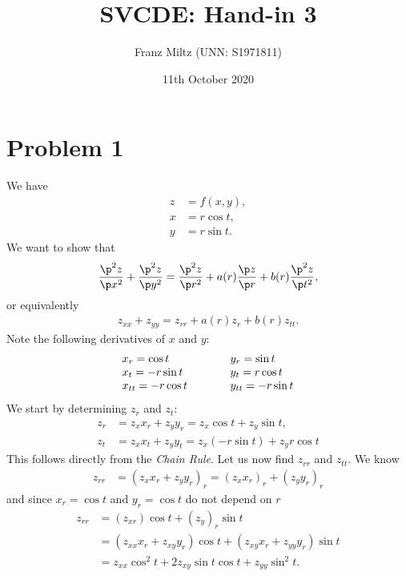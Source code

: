 \documentclass{article}
\begin{document}
\title{SVCDE: Hand-in 3}
\author{Franz Miltz (UNN: S1971811)}
\date{11th October 2020}
\maketitle


\section*{Problem 1}


We have
\begin{align*}
  z &= f(x,y),\\
  x &= r\cos t,\\
  y &= r\sin t.
\end{align*}
We want to show that
\begin{align*}
  \frac{\p^2 z}{\p x^2}+\frac{\p^2 z}{\p y^2}
  = \frac{\p^2 z}{\p r^2}+a(r)\frac{\p z}{\p r}+b(r)\frac{\p^2 z}{\p t^2},
\end{align*}
or equivalently
\begin{align}
  \label{eq1}
  z_{xx} + z_{yy} = z_{rr} + a(r)z_r + b(r)z_{tt}.
\end{align}
Note the following derivatives of $x$ and $y$:
\begin{align*}
  \begin{array}{l l}
  x_r = \cos t &\hspace{1cm} y_r = \sin t\\
  x_t = -r\sin t &\hspace{1cm} y_t = r\cos t\\
  x_{tt} = -r\cos t &\hspace{1cm} y_{tt} = -r\sin t
  \end{array}
\end{align*}
We start by determining $z_r$ and $z_t$:
\begin{align*}
  z_r &= z_x x_r + z_y y_r = z_x \cos t + z_y \sin t,\\
  z_t &= z_x x_t + z_y y_t = z_x (-r\sin t) + z_y r\cos t
\end{align*}
This follows directly from the \emph{Chain Rule}. 
Let us now find $z_{rr}$ and $z_{tt}$. We know
\begin{align*}
    z_{rr} &= (z_x x_r + z_y y_r)_r = (z_x x_r)_r + (z_y y_r)_r
\end{align*}
and since $x_r = \cos t$ and $y_r = \cos t$ do not depend on $r$
\begin{align*}
  z_{rr} &= (z_{xr})\cos t + (z_y)_r \sin t \\
  &=(z_{xx}x_r + z_{xy}y_r)\cos t + (z_{xy}x_r + z_{yy}y_r)\sin t\\
  &=z_{xx}\cos^2 t + 2 z_{xy}\sin t\cos t + z_{yy}\sin^2 t.
\end{align*}
\end{document}
